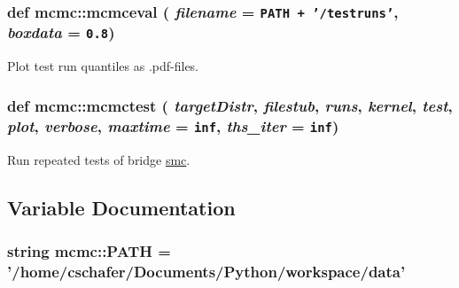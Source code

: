 \hypertarget{namespacemcmc_4ad3e26158616bd6ddc216215bd5198c}{
\subsubsection[{mcmceval}]{\setlength{\rightskip}{0pt plus 5cm}def mcmc::mcmceval ( {\em filename} = {\tt PATH~+~'/testruns'}, \/   {\em boxdata} = {\tt 0.8})}}
\label{namespacemcmc_4ad3e26158616bd6ddc216215bd5198c}


Plot test run quantiles as .pdf-files. 

\hypertarget{namespacemcmc_60fb0f78f00fa057c4f90a4a7ed2f111}{
\subsubsection[{mcmctest}]{\setlength{\rightskip}{0pt plus 5cm}def mcmc::mcmctest ( {\em targetDistr}, \/   {\em filestub}, \/   {\em runs}, \/   {\em kernel}, \/   {\em test}, \/   {\em plot}, \/   {\em verbose}, \/   {\em maxtime} = {\tt inf}, \/   {\em ths\_\-iter} = {\tt inf})}}
\label{namespacemcmc_60fb0f78f00fa057c4f90a4a7ed2f111}


Run repeated tests of bridge \hyperlink{namespacesmc}{smc}. 



\subsection{Variable Documentation}
\hypertarget{namespacemcmc_ed142f91127f59debb6ed1904b67d983}{
\subsubsection[{PATH}]{\setlength{\rightskip}{0pt plus 5cm}string {\bf mcmc::PATH} = '/home/cschafer/Documents/Python/workspace/{\bf data}'}}
\label{namespacemcmc_ed142f91127f59debb6ed1904b67d983}


